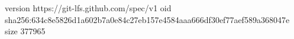 version https://git-lfs.github.com/spec/v1
oid sha256:634c8e5826d1a602b7a0e84c27eb157e4584aaa666df30ef77aef589a368047e
size 377965

